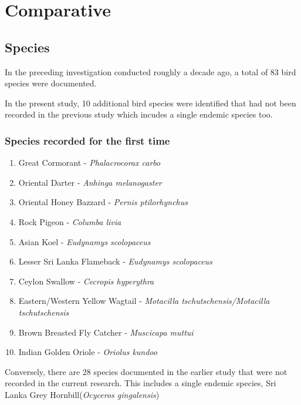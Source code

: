 \chapter{Comparative}
\label{cp:Comparative}
\section{Species}
In the preceding investigation conducted roughly a decade ago, a total of 83 bird species were documented. 

In the present study, 10 additional bird species were identified that had not been recorded in the previous study which incudes a single endemic species too. 

\begin{importantbox}
\subsection{Species recorded for the first time}
\begin{enumerate}
    \item Great Cormorant - \textit{Phalacrocorax carbo}
    \item Oriental Darter - \textit{Anhinga melanogaster}
    \item Oriental Honey Bazzard - \textit{Pernis ptilorhynchus}
    \item Rock Pigeon - \textit{Columba livia}
    \item Asian Koel - \textit{Eudynamys scolopaceus}
    \item Lesser Sri Lanka Flameback - \textit{Eudynamys scolopaceus}
    \item Ceylon Swallow - \textit{Cecropis hyperythra}
    \item Eastern/Western Yellow Wagtail - \textit{Motacilla tschutschensis/Motacilla tschutschensis}
    \item Brown Breasted Fly Catcher - \textit{Muscicapa muttui}
    \item Indian Golden Oriole - \textit{Oriolus kundoo}
\end{enumerate}
\end{importantbox}

Conversely, there are 28 species documented in the earlier study that were not recorded in the current research. This includes a single endemic species, Sri Lanka Grey Hornbill(\textit{Ocyceros gingalensis})
